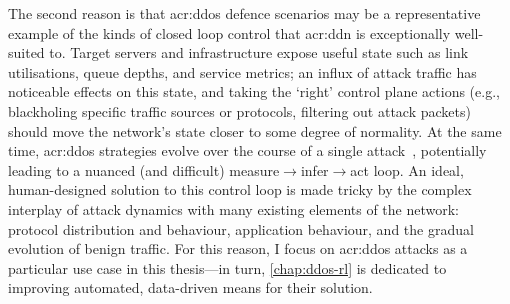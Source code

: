 The second reason is that \gls{acr:ddos} defence scenarios may be a representative example of the kinds of closed loop control that \gls{acr:ddn} is exceptionally well-suited to.
Target servers and infrastructure expose useful state such as link utilisations, queue depths, and service metrics; an influx of attack traffic has noticeable effects on this state, and taking the `right' control plane actions (e.g., blackholing specific traffic sources or protocols, filtering out attack packets) should move the network's state closer to some degree of normality.
At the same time, \gls{acr:ddos} strategies evolve over the course of a single attack~\parencite{DBLP:conf/spw/KangGS16}, potentially leading to a nuanced (and difficult) measure$\rightarrow$infer$\rightarrow$act loop.
An ideal, human-designed solution to this control loop is made tricky by the complex interplay of attack dynamics with many existing elements of the network: protocol distribution and behaviour, application behaviour, and the gradual evolution of benign traffic.
For this reason, I focus on \gls{acr:ddos} attacks as a particular use case in this thesis---in turn, \cref{chap:ddos-rl} is dedicated to improving automated, data-driven means for their solution.





